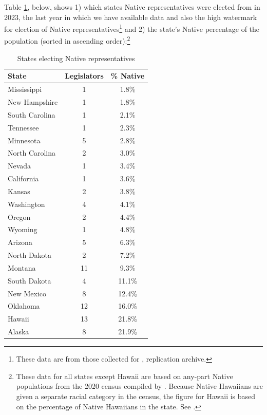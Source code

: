 \documentclass[12pt]{article}
\begin{document}
Table \ref{tab:states_electing_native}, below, shows 1) which states Native representatives were elected from in 2023, the last year in which we have available data and also the high watermark for election of Native representatives\footnote{These data are from those collected for \cite{blasingame2025are}, replication archive.} and 2) the state's Native percentage of the population (sorted in ascending order):\footnote{These data for all states except Hawaii are based on any-part Native populations from the 2020 census compiled by \cite{ncai2021overview}. Because Native Hawaiians are given a separate racial category in the census, the figure for Hawaii is based on the percentage of Native Hawaiians in the state. See \cite{oha2024census}.}

\begin{table}[ht]
\centering
\caption{States electing Native representatives}
\label{tab:states_electing_native}
\begin{tabular}{lcc}
\toprule
State & Legislators & \% Native \\
\midrule
Mississippi    & 1 & 1.8\% \\
New Hampshire  & 1 & 1.8\% \\
South Carolina & 1 & 2.1\% \\
Tennessee      & 1 & 2.3\% \\
Minnesota      & 5 & 2.8\% \\
North Carolina & 2 & 3.0\% \\
Nevada         & 1 & 3.4\% \\
California     & 1 & 3.6\% \\
Kansas         & 2 & 3.8\% \\
Washington     & 4 & 4.1\% \\
Oregon         & 2 & 4.4\% \\
Wyoming        & 1 & 4.8\% \\
Arizona        & 5 & 6.3\% \\
North Dakota   & 2 & 7.2\% \\
Montana        & 11 & 9.3\% \\
South Dakota   & 4 & 11.1\% \\
New Mexico     & 8 & 12.4\% \\
Oklahoma       & 12 & 16.0\% \\
Hawaii         & 13 & 21.8\% \\
Alaska & 8 & 21.9\% \\
\bottomrule
\end{tabular}
\end{table}
\end{document}
